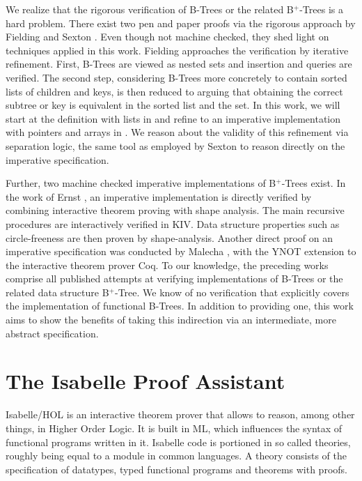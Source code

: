 We realize that the rigorous verification of B-Trees or the related B$^+$-Trees
is a hard problem.
There exist two pen and paper proofs via the rigorous approach
by Fielding \parencite{Fielding80} and Sexton \parencite{DBLP:journals/entcs/SextonT08}.
Even though not machine checked, they shed light on techniques applied in this work.
Fielding approaches the verification by iterative refinement.
First, B-Trees are viewed as nested sets and insertion and queries
are verified.
The second step, considering B-Trees more concretely to contain
sorted lists of children and keys, is then reduced to arguing
that obtaining the correct subtree or key is equivalent in the sorted list
and the set.
In this work, we will start at the definition with lists in 
and refine to an imperative implementation with pointers and arrays in .
We reason about the validity of this refinement via separation logic,
the same tool as employed by Sexton \parencite{DBLP:journals/entcs/SextonT08}
to reason directly on the imperative specification.

Further, two machine checked imperative implementations of B$^+$-Trees exist.
In the work of Ernst \parencite{DBLP:journals/sosym/ErnstSR15},
an imperative implementation is directly verified
by combining interactive theorem proving 
with shape analysis.
The main recursive procedures are interactively verified in KIV.
Data structure properties such as circle-freeness are then proven by shape-analysis.
Another direct proof on an imperative specification 
was conducted by Malecha \parencite{DBLP:conf/popl/MalechaMSW10}, with the YNOT
extension to the interactive theorem prover Coq.
To our knowledge, the preceding works comprise
all published attempts at verifying implementations of B-Trees
or the related data structure B$^+$-Tree.
We know of no verification that explicitly covers
the implementation of functional B-Trees.
In addition to providing one, this work aims to show the benefits
of taking this indirection via an intermediate, more abstract specification.

\section{The Isabelle Proof Assistant}

Isabelle/HOL is an interactive theorem prover that allows
to reason, among other things, in Higher Order Logic.\parencite{DBLP:books/sp/NipkowPW02}
It is built in ML, which influences the syntax of functional
programs written in it.
Isabelle code is portioned in so called theories,
roughly being equal to a module in common languages.
A theory consists of the specification of datatypes,
typed functional programs and theorems with proofs.

